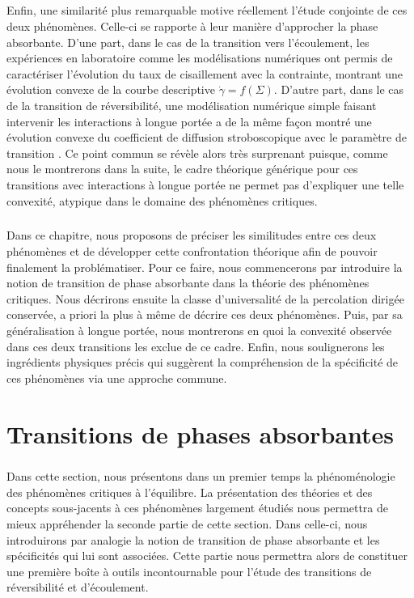 \subparagraph{}Enfin, une similarité plus remarquable motive réellement l'étude conjointe de ces deux phénomènes. Celle-ci se rapporte à leur manière d'approcher la phase absorbante. D'une part, dans le cas de la transition vers l'écoulement, les expériences en laboratoire comme les modélisations numériques ont permis de caractériser l'évolution du taux de cisaillement avec la contrainte, montrant une évolution convexe de la courbe descriptive $\dot{\gamma} = f(\Sigma)$. D'autre part, dans le cas de la transition de réversibilité, une modélisation numérique simple faisant intervenir les interactions à longue portée a de la même façon montré une évolution convexe du coefficient de diffusion stroboscopique avec le paramètre de transition \cite{mari_absorbing_2022}. Ce point commun se révèle alors très surprenant puisque, comme nous le montrerons dans la suite, le cadre théorique générique pour ces transitions avec interactions à longue portée ne permet pas d'expliquer une telle convexité, atypique dans le domaine des phénomènes critiques. 

\subparagraph{}Dans ce chapitre, nous proposons de préciser les similitudes entre ces deux phénomènes et de développer cette confrontation théorique afin de pouvoir finalement la problématiser. Pour ce faire, nous commencerons par introduire la notion de transition de phase absorbante dans la théorie des phénomènes critiques. Nous décrirons ensuite la classe d'universalité de la percolation dirigée conservée, a priori la plus à même de décrire ces deux phénomènes. Puis, par sa généralisation à longue portée, nous montrerons en quoi la convexité observée dans ces deux transitions les exclue de ce cadre. Enfin, nous soulignerons les ingrédients physiques précis qui suggèrent la compréhension de la spécificité de ces phénomènes via une approche commune.

\section{Transitions de phases absorbantes}

\subparagraph{}Dans cette section, nous présentons dans un premier temps la phénoménologie des phénomènes critiques à l'équilibre. La présentation des théories et des concepts sous-jacents à ces phénomènes largement étudiés nous permettra de mieux appréhender la seconde partie de cette section. Dans celle-ci, nous introduirons par analogie la notion de transition de phase absorbante et les spécificités qui lui sont associées. Cette partie nous permettra alors de constituer une première boîte à outils incontournable pour l'étude des transitions de réversibilité et d'écoulement.

